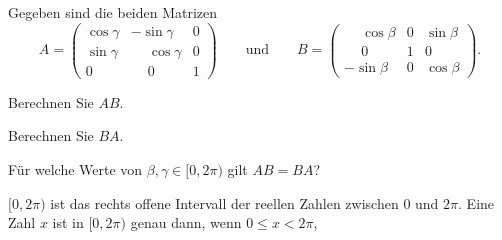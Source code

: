 Gegeben sind die beiden Matrizen
\[
A
=
\begin{pmatrix}
\cos\gamma&         - \sin\gamma&0\\
\sin\gamma&\phantom{-}\cos\gamma&0\\
    0     &\phantom{-}    0     &1
\end{pmatrix}
\qquad\text{und}\qquad
B
=
\begin{pmatrix}
\phantom{-}\cos\beta&0&\sin\beta\\
\phantom{-}    0    &1&    0    \\
         - \sin\beta&0&\cos\beta
\end{pmatrix}.
\]
\begin{teilaufgaben}
\item Berechnen Sie $AB$.
\item Berechnen Sie $BA$.
\item Für welche Werte von $\beta,\gamma\in[0,2\pi)$ gilt
$AB=BA$?
\end{teilaufgaben}


\begin{hinweis}
$[0,2\pi)$ ist das rechts offene Intervall der reellen Zahlen zwischen 
$0$ und $2\pi$.
Eine Zahl $x$ ist in $[0,2\pi)$ genau dann,
wenn $0\le x<2\pi$,
\end{hinweis}

